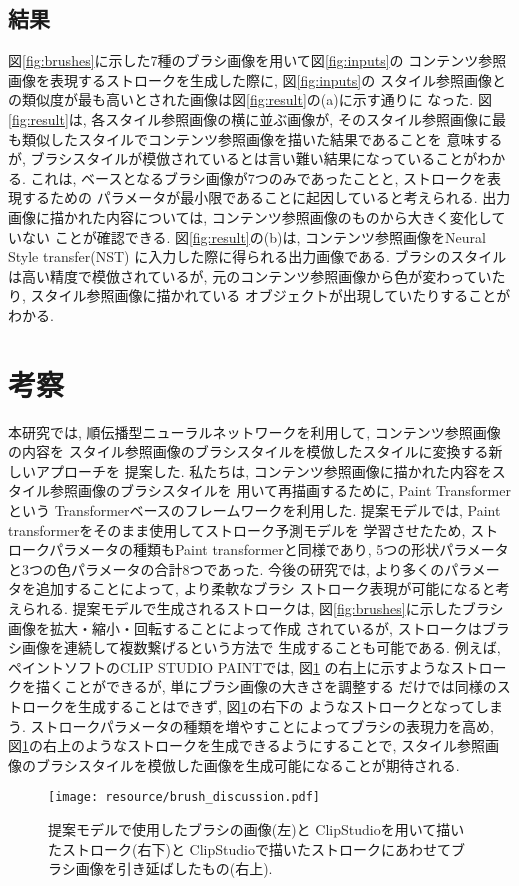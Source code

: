 \documentclass[MIRU,submit,uplatex]{miru2023j}
\begin{document}
\subsection{結果}
図\ref{fig:brushes}に示した7種のブラシ画像を用いて図\ref{fig:inputs}の
コンテンツ参照画像を表現するストロークを生成した際に, 図\ref{fig:inputs}の
スタイル参照画像との類似度が最も高いとされた画像は図\ref{fig:result}の(a)に示す通りに
なった. 図\ref{fig:result}は, 各スタイル参照画像の横に並ぶ画像が, 
そのスタイル参照画像に最も類似したスタイルでコンテンツ参照画像を描いた結果であることを
意味するが, ブラシスタイルが模倣されているとは言い難い結果になっていることがわかる. 
これは, ベースとなるブラシ画像が7つのみであったことと, ストロークを表現するための
パラメータが最小限であることに起因していると考えられる.
出力画像に描かれた内容については, コンテンツ参照画像のものから大きく変化していない
ことが確認できる.
図\ref{fig:result}の(b)は, コンテンツ参照画像をNeural Style transfer(NST) \cite{IST}
に入力した際に得られる出力画像である. ブラシのスタイルは高い精度で模倣されているが,
元のコンテンツ参照画像から色が変わっていたり, スタイル参照画像に描かれている
オブジェクトが出現していたりすることがわかる.


\section{考察}
本研究では, 順伝播型ニューラルネットワークを利用して, コンテンツ参照画像の内容を
スタイル参照画像のブラシスタイルを模倣したスタイルに変換する新しいアプローチを
提案した. 私たちは, コンテンツ参照画像に描かれた内容をスタイル参照画像のブラシスタイルを
用いて再描画するために, Paint Transformer \cite{PaintTransformer} という
Transformerベースのフレームワークを利用した. 
提案モデルでは, Paint transformerをそのまま使用してストローク予測モデルを
学習させたため, ストロークパラメータの種類もPaint transformerと同様であり,  
5つの形状パラメータと3つの色パラメータの合計8つであった. 
今後の研究では, より多くのパラメータを追加することによって, より柔軟なブラシ
ストローク表現が可能になると考えられる. 提案モデルで生成されるストロークは, 
図\ref{fig:brushes}に示したブラシ画像を拡大・縮小・回転することによって作成
されているが, ストロークはブラシ画像を連続して複数繋げるという方法で
生成することも可能である. 
例えば, ペイントソフトのCLIP STUDIO PAINT\cite{ClipStudio}では, 図\ref{fig:discussion}
の右上に示すようなストロークを描くことができるが, 単にブラシ画像の大きさを調整する
だけでは同様のストロークを生成することはできず, 図\ref{fig:discussion}の右下の
ようなストロークとなってしまう. 
ストロークパラメータの種類を増やすことによってブラシの表現力を高め, 
図\ref{fig:discussion}の右上のようなストロークを生成できるようにすることで, 
スタイル参照画像のブラシスタイルを模倣した画像を生成可能になることが期待される. 
\begin{figure}[t]
    \centering
    \texttt{[image: resource/brush\_discussion.pdf]}
    \caption{提案モデルで使用したブラシの画像(左)と
    ClipStudioを用いて描いたストローク(右下)と
    ClipStudioで描いたストロークにあわせてブラシ画像を引き延ばしたもの(右上).}
    \label{fig:discussion}
\end{figure}
%
\end{document}
